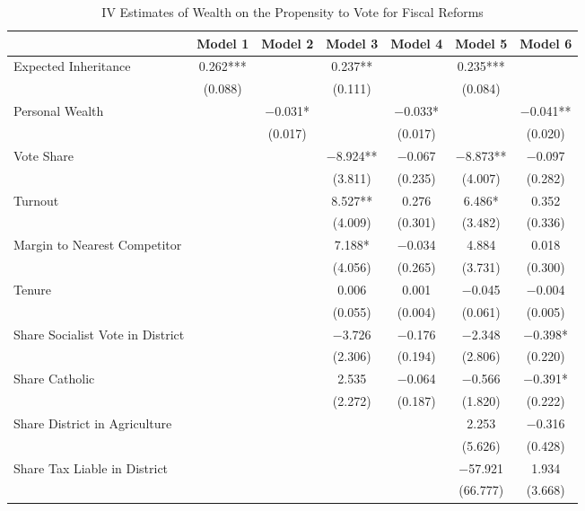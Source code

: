 \begin{table}

\caption{\label{tab:ivresults_fisc_inherit}IV Estimates of Wealth on the Propensity to Vote for Fiscal Reforms}
\centering
\begin{tabular}[t]{lcccccc}
\toprule
  & Model 1 & Model 2 & Model 3 & Model 4 & Model 5 & Model 6\\
\midrule
Expected Inheritance & \num{0.262}*** &  & \num{0.237}** &  & \num{0.235}*** & \\
 & (\num{0.088}) &  & (\num{0.111}) &  & (\num{0.084}) & \\
Personal Wealth &  & \num{-0.031}* &  & \num{-0.033}* &  & \num{-0.041}**\\
 &  & (\num{0.017}) &  & (\num{0.017}) &  & (\num{0.020})\\
Vote Share &  &  & \num{-8.924}** & \num{-0.067} & \num{-8.873}** & \num{-0.097}\\
 &  &  & (\num{3.811}) & (\num{0.235}) & (\num{4.007}) & (\num{0.282})\\
Turnout &  &  & \num{8.527}** & \num{0.276} & \num{6.486}* & \num{0.352}\\
 &  &  & (\num{4.009}) & (\num{0.301}) & (\num{3.482}) & (\num{0.336})\\
Margin to Nearest Competitor &  &  & \num{7.188}* & \num{-0.034} & \num{4.884} & \num{0.018}\\
 &  &  & (\num{4.056}) & (\num{0.265}) & (\num{3.731}) & (\num{0.300})\\
Tenure &  &  & \num{0.006} & \num{0.001} & \num{-0.045} & \num{-0.004}\\
 &  &  & (\num{0.055}) & (\num{0.004}) & (\num{0.061}) & (\num{0.005})\\
Share Socialist Vote in District &  &  & \num{-3.726} & \num{-0.176} & \num{-2.348} & \num{-0.398}*\\
 &  &  & (\num{2.306}) & (\num{0.194}) & (\num{2.806}) & (\num{0.220})\\
Share Catholic &  &  & \num{2.535} & \num{-0.064} & \num{-0.566} & \num{-0.391}*\\
 &  &  & (\num{2.272}) & (\num{0.187}) & (\num{1.820}) & (\num{0.222})\\
Share District in Agriculture &  &  &  &  & \num{2.253} & \num{-0.316}\\
 &  &  &  &  & (\num{5.626}) & (\num{0.428})\\
Share Tax Liable in District &  &  &  &  & \num{-57.921} & \num{1.934}\\
 &  &  &  &  & (\num{66.777}) & (\num{3.668})\\

\end{tabular}
\end{table}
